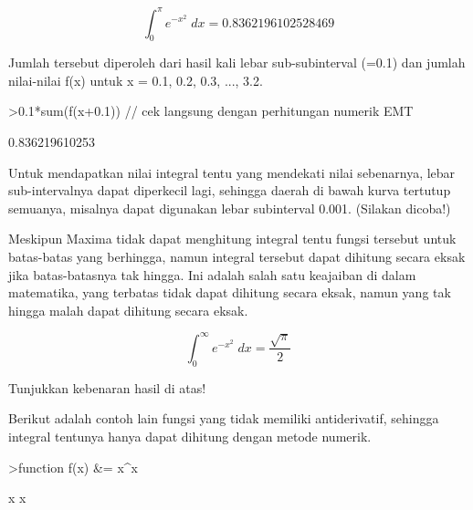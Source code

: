 \documentclass[a4paper,10pt]{article}
\begin{document}
\begin{eulernotebook}
\begin{eulercomment}
\end{eulercomment}
\begin{eulerformula}
\[
\int_{0}^{\pi}{e^ {- x^2 }\;dx}=0.8362196102528469
\]
\end{eulerformula}
\begin{eulercomment}
Jumlah tersebut diperoleh dari hasil kali lebar sub-subinterval (=0.1)
dan jumlah nilai-nilai f(x) untuk x = 0.1, 0.2, 0.3, ..., 3.2.
\end{eulercomment}
\begin{eulerprompt}
>0.1*sum(f(x+0.1)) // cek langsung dengan perhitungan numerik EMT
\end{eulerprompt}
\begin{euleroutput}
  0.836219610253
\end{euleroutput}
\begin{eulercomment}
Untuk mendapatkan nilai integral tentu yang mendekati nilai
sebenarnya, lebar sub-intervalnya dapat diperkecil lagi, sehingga
daerah di bawah kurva tertutup semuanya, misalnya dapat digunakan
lebar subinterval 0.001. (Silakan dicoba!)

Meskipun Maxima tidak dapat menghitung integral tentu fungsi tersebut
untuk batas-batas yang berhingga, namun integral tersebut dapat
dihitung secara eksak jika batas-batasnya tak hingga. Ini adalah salah
satu keajaiban di dalam matematika, yang terbatas tidak dapat dihitung
secara eksak, namun yang tak hingga malah dapat dihitung secara eksak.
\end{eulercomment}
\begin{eulerformula}
\[
\int_{0}^{\infty }{e^ {- x^2 }\;dx}=\frac{\sqrt{\pi}}{2}
\]
\end{eulerformula}
\begin{eulercomment}
Tunjukkan kebenaran hasil di atas!

Berikut adalah contoh lain fungsi yang tidak memiliki antiderivatif, sehingga integral tentunya hanya
dapat dihitung dengan metode numerik.
\end{eulercomment}
\begin{eulerprompt}
>function f(x) &= x^x
\end{eulerprompt}
\begin{euleroutput}
  
                                     x
                                    x
  

\end{euleroutput}
\end{eulernotebook}
\end{document}
